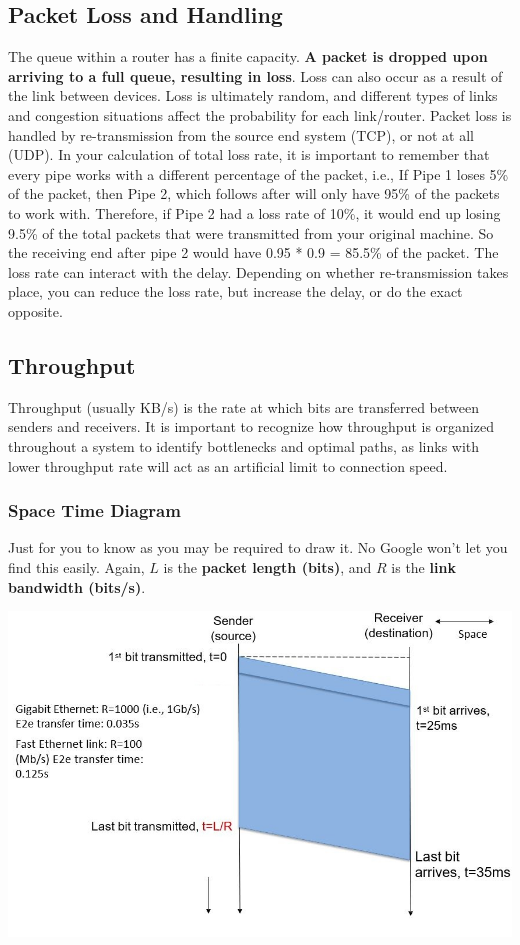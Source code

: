 \documentclass{article}
\begin{document}
\subsection{Packet Loss and Handling}
The queue within a router has a finite capacity. \textbf{A packet is dropped upon arriving to a full queue, resulting in loss}. Loss can also occur as a result of the link between devices. Loss is ultimately random, and different types of links and congestion situations affect the probability for each link/router. Packet loss is handled by re-transmission from the source end system (TCP), or not at all (UDP). In your calculation of total loss rate, it is important to remember that every pipe works with a different percentage of the packet, i.e., If Pipe 1 loses 5\% of the packet, then Pipe 2, which follows after will only have 95\% of the packets to work with. Therefore, if Pipe 2 had a loss rate of 10\%, it would end up losing 9.5\% of the total packets that were transmitted from your original machine. So the receiving end after pipe 2 would have 0.95 * 0.9 = 85.5\% of the packet. The loss rate can interact with the delay. Depending on whether re-transmission takes place, you can reduce the loss rate, but increase the delay, or do the exact opposite.

\subsection{Throughput}
Throughput (usually KB/s) is the rate at which bits are transferred between senders and receivers. It is important to recognize how throughput is organized throughout a system to identify bottlenecks and optimal paths, as links with lower throughput rate will act as an artificial limit to connection speed.

\subsubsection{Space Time Diagram}
Just for you to know as you may be required to draw it. No Google won't let you find this easily. Again, $L$ is the \textbf{packet length (bits)}, and $R$ is the \textbf{link bandwidth (bits/s)}. 

\begin{center}
\includegraphics[width=\textwidth]{spacetimediagram.JPG}
\end{center}
\end{document}
